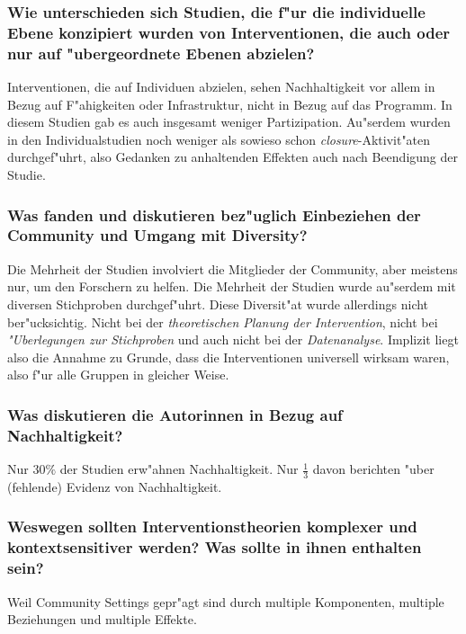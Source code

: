 \subsubsection{Wie unterschieden sich Studien, die f"ur die individuelle Ebene konzipiert wurden von Interventionen, die auch oder nur auf "ubergeordnete Ebenen abzielen?}
Interventionen, die auf Individuen abzielen, sehen Nachhaltigkeit vor allem in Bezug auf F"ahigkeiten oder Infrastruktur, nicht in Bezug auf das Programm. In diesem Studien gab es auch insgesamt weniger Partizipation. Au"serdem wurden in den Individualstudien noch weniger als sowieso schon \emph{closure}-Aktivit"aten durchgef"uhrt, also Gedanken zu anhaltenden Effekten auch nach Beendigung der Studie.

\subsubsection{Was fanden und diskutieren \textcite{trickett_how_2011} bez"uglich Einbeziehen der Community und Umgang mit Diversity?}
Die Mehrheit der Studien involviert die Mitglieder der Community, aber meistens nur, um den Forschern zu helfen. Die Mehrheit der Studien wurde au"serdem mit diversen Stichproben durchgef"uhrt. Diese Diversit"at wurde allerdings nicht ber"ucksichtig. Nicht bei der \emph{theoretischen Planung der Intervention}, nicht bei \emph{"Uberlegungen zur Stichproben} und auch nicht bei der \emph{Datenanalyse}. Implizit liegt also die Annahme zu Grunde, dass die Interventionen universell wirksam waren, also f"ur alle Gruppen in gleicher Weise. 

\subsubsection{Was diskutieren die Autorinnen in Bezug auf Nachhaltigkeit?}
Nur $30 \%$ der Studien erw"ahnen Nachhaltigkeit. Nur $\frac{1}{3}$ davon berichten "uber (fehlende) Evidenz von Nachhaltigkeit. 

\subsubsection{Weswegen sollten Interventionstheorien komplexer und kontextsensitiver werden? Was sollte in ihnen enthalten sein?}
Weil Community Settings gepr"agt sind durch multiple Komponenten,  multiple Beziehungen und multiple Effekte.
